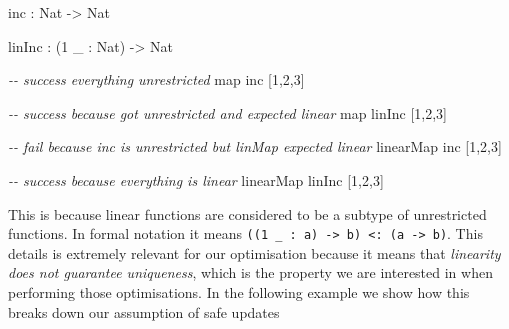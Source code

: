 \documentclass[
]{article}
\newenvironment{Shaded}{}{}
\newcommand{\CommentTok}[1]{\textcolor[rgb]{0.38,0.63,0.69}{\textit{#1}}}
\newcommand{\DataTypeTok}[1]{\textcolor[rgb]{0.56,0.13,0.00}{#1}}
\newcommand{\DecValTok}[1]{\textcolor[rgb]{0.25,0.63,0.44}{#1}}
\newcommand{\FunctionTok}[1]{\textcolor[rgb]{0.02,0.16,0.49}{#1}}
\newcommand{\KeywordTok}[1]{\textcolor[rgb]{0.00,0.44,0.13}{\textbf{#1}}}
\newcommand{\NormalTok}[1]{#1}
\newcommand{\OperatorTok}[1]{\textcolor[rgb]{0.40,0.40,0.40}{#1}}
\newcommand{\OtherTok}[1]{\textcolor[rgb]{0.00,0.44,0.13}{#1}}
\begin{document}
\begin{Shaded}
\begin{Highlighting}[]
\NormalTok{inc }\OperatorTok{:} \DataTypeTok{Nat} \OtherTok{{-}\textgreater{}} \DataTypeTok{Nat}

\NormalTok{linInc }\OperatorTok{:}\NormalTok{ (}\DecValTok{1}\NormalTok{ \_ }\OperatorTok{:} \DataTypeTok{Nat}\NormalTok{) }\OtherTok{{-}\textgreater{}} \DataTypeTok{Nat}

\CommentTok{{-}{-} success everything unrestricted}
\FunctionTok{map}\NormalTok{ inc [}\DecValTok{1}\NormalTok{,}\DecValTok{2}\NormalTok{,}\DecValTok{3}\NormalTok{] }

\CommentTok{{-}{-} success because got unrestricted and expected linear}
\FunctionTok{map}\NormalTok{ linInc [}\DecValTok{1}\NormalTok{,}\DecValTok{2}\NormalTok{,}\DecValTok{3}\NormalTok{]}

\CommentTok{{-}{-} fail because inc is unrestricted but linMap expected linear}
\NormalTok{linearMap inc [}\DecValTok{1}\NormalTok{,}\DecValTok{2}\NormalTok{,}\DecValTok{3}\NormalTok{]}

\CommentTok{{-}{-} success because everything is linear}
\NormalTok{linearMap linInc [}\DecValTok{1}\NormalTok{,}\DecValTok{2}\NormalTok{,}\DecValTok{3}\NormalTok{]}
\end{Highlighting}
\end{Shaded}

This is because linear functions are considered to be a subtype of
unrestricted functions. In formal notation it means
\texttt{((1\ \_\ :\ a)\ -\textgreater{}\ b)\ \textless{}:\ (a\ -\textgreater{}\ b)}.
This details is extremely relevant for our optimisation because it means
that \emph{linearity does not guarantee uniqueness}, which is the
property we are interested in when performing those optimisations. In
the following example we show how this breaks down our assumption of
safe updates

\begin{Shaded}
\end{Shaded}
\end{document}
